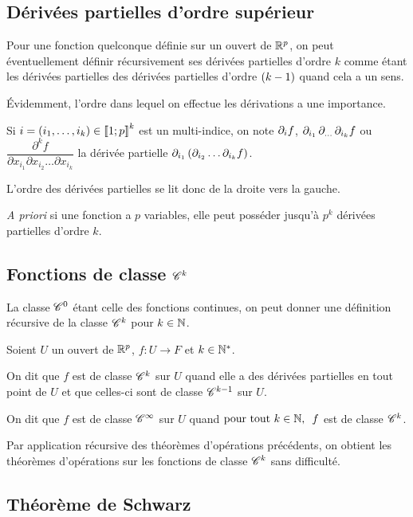 \subsection{Dérivées partielles d'ordre supérieur}

Pour une fonction quelconque définie sur un ouvert de \(\mathbb{R}^p\), on peut éventuellement définir récursivement ses dérivées partielles d'ordre \(k\) comme étant les dérivées partielles des dérivées partielles d'ordre \(\left(k-1\right)\) quand cela a un sens.

Évidemment, l'ordre dans lequel on effectue les dérivations a une importance.

Si \(i=\left(i_1,\dots,i_k\right)\in\left\llbracket1;p\right\rrbracket^k\) est un multi-indice, on note \(\pdif{i}f\), \(\pdif{i_1,\dots,i_k}f\) ou \(\dfrac{\partial^kf}{\partial x_{i_1}\partial x_{i_2}\dots\partial x_{i_k}}\) la dérivée partielle \(\pdif{i_1}\paren{\pdif{i_2}\dots\pdif{i_k}f}\).

L'ordre des dérivées partielles se lit donc de la droite vers la gauche.

\textit{A priori} si une fonction a \(p\) variables, elle peut posséder jusqu'à \(p^k\) dérivées partielles d'ordre \(k\).

\subsection{Fonctions de classe \(\mathscr{C}^{k}\)}

La classe \(\mathscr{C}^{0}\) étant celle des fonctions continues, on peut donner une définition récursive de la classe \(\mathscr{C}^{k}\) pour \(k\in\mathbb{N}\).

\begin{defi}
Soient \(U\) un ouvert de \(\mathbb{R}^p\), \(f:U\to F\) et \(k\in\mathbb{N}^*\).

On dit que \(f\) est de classe \(\mathscr{C}^{k}\) sur \(U\) quand elle a des dérivées partielles en tout point de \(U\) et que celles-ci sont de classe \(\mathscr{C}^{k-1}\) sur \(U\).

On dit que \(f\) est de classe \(\mathscr{C}^{\infty}\) sur \(U\) quand \(\quantifs{\tpt k\in\N}f\) est de classe \(\mathscr{C}^{k}\).
\end{defi}

Par application récursive des théorèmes d'opérations précédents, on obtient les théorèmes d'opérations sur les fonctions de classe \(\mathscr{C}^{k}\) sans difficulté.

\subsection{Théorème de Schwarz}

